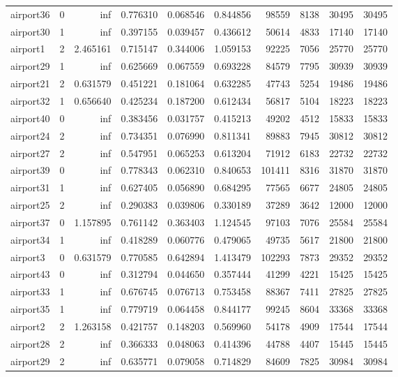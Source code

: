\begin{longtable}{|l|r|r|r|r|r|r|r|r|r|}
airport36 & 0 & inf & 0.776310 & 0.068546 & 0.844856 & 98559 & 8138 & 30495 & 30495 \\
airport30 & 1 & inf & 0.397155 & 0.039457 & 0.436612 & 50614 & 4833 & 17140 & 17140 \\
airport1 & 2 & 2.465161 & 0.715147 & 0.344006 & 1.059153 & 92225 & 7056 & 25770 & 25770 \\
airport29 & 1 & inf & 0.625669 & 0.067559 & 0.693228 & 84579 & 7795 & 30939 & 30939 \\
airport21 & 2 & 0.631579 & 0.451221 & 0.181064 & 0.632285 & 47743 & 5254 & 19486 & 19486 \\
airport32 & 1 & 0.656640 & 0.425234 & 0.187200 & 0.612434 & 56817 & 5104 & 18223 & 18223 \\
airport40 & 0 & inf & 0.383456 & 0.031757 & 0.415213 & 49202 & 4512 & 15833 & 15833 \\
airport24 & 2 & inf & 0.734351 & 0.076990 & 0.811341 & 89883 & 7945 & 30812 & 30812 \\
airport27 & 2 & inf & 0.547951 & 0.065253 & 0.613204 & 71912 & 6183 & 22732 & 22732 \\
airport39 & 0 & inf & 0.778343 & 0.062310 & 0.840653 & 101411 & 8316 & 31870 & 31870 \\
airport31 & 1 & inf & 0.627405 & 0.056890 & 0.684295 & 77565 & 6677 & 24805 & 24805 \\
airport25 & 2 & inf & 0.290383 & 0.039806 & 0.330189 & 37289 & 3642 & 12000 & 12000 \\
airport37 & 0 & 1.157895 & 0.761142 & 0.363403 & 1.124545 & 97103 & 7076 & 25584 & 25584 \\
airport34 & 1 & inf & 0.418289 & 0.060776 & 0.479065 & 49735 & 5617 & 21800 & 21800 \\
airport3 & 0 & 0.631579 & 0.770585 & 0.642894 & 1.413479 & 102293 & 7873 & 29352 & 29352 \\
airport43 & 0 & inf & 0.312794 & 0.044650 & 0.357444 & 41299 & 4221 & 15425 & 15425 \\
airport33 & 1 & inf & 0.676745 & 0.076713 & 0.753458 & 88367 & 7411 & 27825 & 27825 \\
airport35 & 1 & inf & 0.779719 & 0.064458 & 0.844177 & 99245 & 8604 & 33368 & 33368 \\
airport2 & 2 & 1.263158 & 0.421757 & 0.148203 & 0.569960 & 54178 & 4909 & 17544 & 17544 \\
airport28 & 2 & inf & 0.366333 & 0.048063 & 0.414396 & 44788 & 4407 & 15445 & 15445 \\
airport29 & 2 & inf & 0.635771 & 0.079058 & 0.714829 & 84609 & 7825 & 30984 & 30984 \\

\end{longtable}
